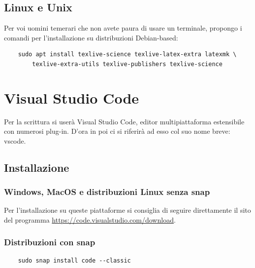 \documentclass[envcountsame,envcountchap]{svmono}
\begin{document}
\subsection{Linux e Unix}
Per voi uomini temerari che non avete paura di usare un terminale, 
propongo i comandi per l'installazione su distribuzioni Debian-based:
\begin{verbatim}
    sudo apt install texlive-science texlive-latex-extra latexmk \
        texlive-extra-utils texlive-publishers texlive-science
\end{verbatim}

\section{Visual Studio Code}
Per la scrittura si userà Visual Studio Code, editor multipiattaforma 
estensibile con numerosi plug-in.
D'ora in poi ci si riferirà ad esso col suo nome breve: vscode.

\subsection{Installazione}
\subsubsection{Windows, MacOS e distribuzioni Linux senza snap}
Per l'installazione su queste piattaforme si consiglia di seguire 
direttamente il sito del programma \url{https://code.visualstudio.com/download}.

\subsubsection{Distribuzioni con snap}
\begin{verbatim}
    sudo snap install code --classic
\end{verbatim}
\end{document}
